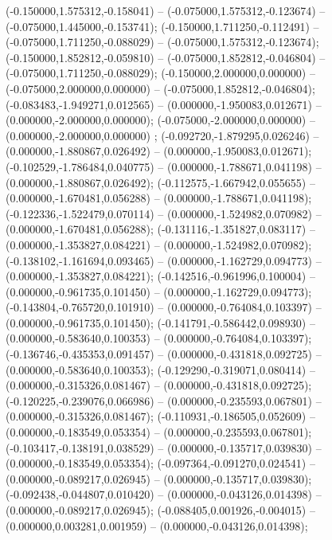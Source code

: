  (-0.150000,1.575312,-0.158041) -- (-0.075000,1.575312,-0.123674) -- (-0.075000,1.445000,-0.153741);
 (-0.150000,1.711250,-0.112491) -- (-0.075000,1.711250,-0.088029) -- (-0.075000,1.575312,-0.123674);
 (-0.150000,1.852812,-0.059810) -- (-0.075000,1.852812,-0.046804) -- (-0.075000,1.711250,-0.088029);
 (-0.150000,2.000000,0.000000) -- (-0.075000,2.000000,0.000000) -- (-0.075000,1.852812,-0.046804);
 (-0.083483,-1.949271,0.012565) -- (0.000000,-1.950083,0.012671) -- (0.000000,-2.000000,0.000000);
 (-0.075000,-2.000000,0.000000) -- (0.000000,-2.000000,0.000000) ;
 (-0.092720,-1.879295,0.026246) -- (0.000000,-1.880867,0.026492) -- (0.000000,-1.950083,0.012671);
 (-0.102529,-1.786484,0.040775) -- (0.000000,-1.788671,0.041198) -- (0.000000,-1.880867,0.026492);
 (-0.112575,-1.667942,0.055655) -- (0.000000,-1.670481,0.056288) -- (0.000000,-1.788671,0.041198);
 (-0.122336,-1.522479,0.070114) -- (0.000000,-1.524982,0.070982) -- (0.000000,-1.670481,0.056288);
 (-0.131116,-1.351827,0.083117) -- (0.000000,-1.353827,0.084221) -- (0.000000,-1.524982,0.070982);
 (-0.138102,-1.161694,0.093465) -- (0.000000,-1.162729,0.094773) -- (0.000000,-1.353827,0.084221);
 (-0.142516,-0.961996,0.100004) -- (0.000000,-0.961735,0.101450) -- (0.000000,-1.162729,0.094773);
 (-0.143804,-0.765720,0.101910) -- (0.000000,-0.764084,0.103397) -- (0.000000,-0.961735,0.101450);
 (-0.141791,-0.586442,0.098930) -- (0.000000,-0.583640,0.100353) -- (0.000000,-0.764084,0.103397);
 (-0.136746,-0.435353,0.091457) -- (0.000000,-0.431818,0.092725) -- (0.000000,-0.583640,0.100353);
 (-0.129290,-0.319071,0.080414) -- (0.000000,-0.315326,0.081467) -- (0.000000,-0.431818,0.092725);
 (-0.120225,-0.239076,0.066986) -- (0.000000,-0.235593,0.067801) -- (0.000000,-0.315326,0.081467);
 (-0.110931,-0.186505,0.052609) -- (0.000000,-0.183549,0.053354) -- (0.000000,-0.235593,0.067801);
 (-0.103417,-0.138191,0.038529) -- (0.000000,-0.135717,0.039830) -- (0.000000,-0.183549,0.053354);
 (-0.097364,-0.091270,0.024541) -- (0.000000,-0.089217,0.026945) -- (0.000000,-0.135717,0.039830);
 (-0.092438,-0.044807,0.010420) -- (0.000000,-0.043126,0.014398) -- (0.000000,-0.089217,0.026945);
 (-0.088405,0.001926,-0.004015) -- (0.000000,0.003281,0.001959) -- (0.000000,-0.043126,0.014398);
